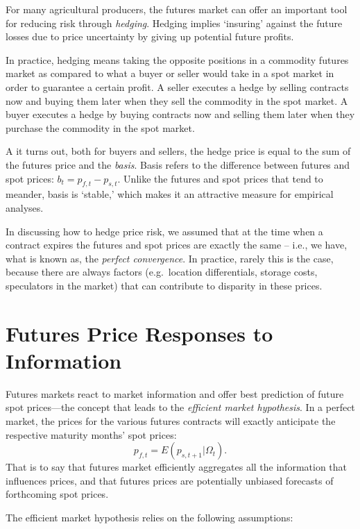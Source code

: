 \documentclass[
  oneside]{book}
\begin{document}
For many agricultural producers, the futures market can offer an important tool for reducing risk through \emph{hedging}. Hedging implies `insuring' against the future losses due to price uncertainty by giving up potential future profits.

In practice, hedging means taking the opposite positions in a commodity futures market as compared to what a buyer or seller would take in a spot market in order to guarantee a certain profit. A seller executes a hedge by selling contracts now and buying them later when they sell the commodity in the spot market. A buyer executes a hedge by buying contracts now and selling them later when they purchase the commodity in the spot market.

A it turns out, both for buyers and sellers, the hedge price is equal to the sum of the futures price and the \emph{basis}. Basis refers to the difference between futures and spot prices: \(b_{t} = p_{f,t}-p_{s,t}\). Unlike the futures and spot prices that tend to meander, basis is `stable,' which makes it an attractive measure for empirical analyses.

In discussing how to hedge price risk, we assumed that at the time when a contract expires the futures and spot prices are exactly the same -- i.e., we have, what is known as, the \emph{perfect convergence}. In practice, rarely this is the case, because there are always factors (e.g.~location differentials, storage costs, speculators in the market) that can contribute to disparity in these prices.

\hypertarget{futures-price-responses-to-information}{%
\section{Futures Price Responses to Information}\label{futures-price-responses-to-information}}

Futures markets react to market information and offer best prediction of future spot prices---the concept that leads to the \emph{efficient market hypothesis}. In a perfect market, the prices for the various futures contracts will exactly anticipate the respective maturity months' spot prices: \[p_{f,t} = E\!\left(p_{s,t+1}|\Omega_t\right).\] That is to say that futures market efficiently aggregates all the information that influences prices, and that futures prices are potentially unbiased forecasts of forthcoming spot prices.

The efficient market hypothesis relies on the following assumptions:
\end{document}
